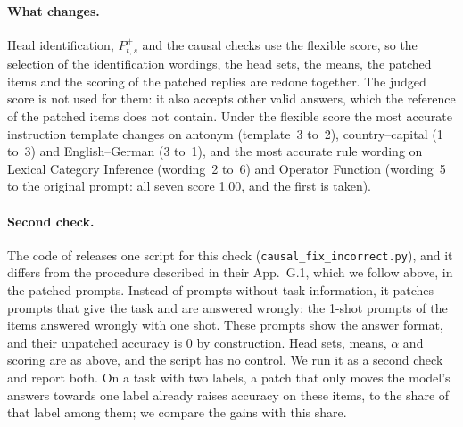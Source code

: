 \documentclass[11pt,a4paper]{article}
\begin{document}
\paragraph{What changes.} Head identification, $P^{+}_{t,s}$ and the causal checks use the flexible score, so the selection of the identification wordings, the head sets, the means, the patched items and the scoring of the patched replies are redone together. The judged score is not used for them: it also accepts other valid answers, which the reference of the patched items does not contain. Under the flexible score the most accurate instruction template changes on antonym (template~3 to~2), country--capital (1 to~3) and English--German (3 to~1), and the most accurate rule wording on Lexical Category Inference (wording~2 to~6) and Operator Function (wording~5 to the original prompt: all seven score 1.00, and the first is taken).

\paragraph{Second check.} The code of \citet{yang2026shared} releases one script for this check (\texttt{causal\_fix\_incorrect.py}), and it differs from the procedure described in their App.~G.1, which we follow above, in the patched prompts. Instead of prompts without task information, it patches prompts that give the task and are answered wrongly: the 1-shot prompts of the items answered wrongly with one shot. These prompts show the answer format, and their unpatched accuracy is 0 by construction. Head sets, means, $\alpha$ and scoring are as above, and the script has no control. We run it as a second check and report both. On a task with two labels, a patch that only moves the model's answers towards one label already raises accuracy on these items, to the share of that label among them; we compare the gains with this share.
\end{document}
